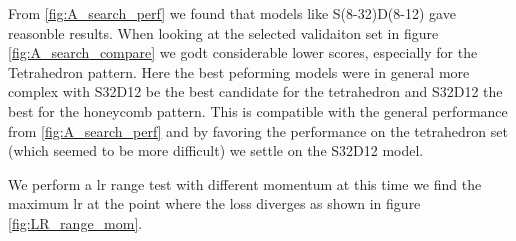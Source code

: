 From \cref{fig:A_search_perf} we found that models like S(8-32)D(8-12) gave reasonble results. When looking at the selected validaiton set in figure \cref{fig:A_search_compare} we godt considerable lower scores, especially for the Tetrahedron pattern. Here the best peforming models were in general more complex with S32D12 be the best candidate for the tetrahedron and S32D12 the best for the honeycomb pattern. This is compatible with the general performance from \cref{fig:A_search_perf} and by favoring the performance on the tetrahedron set (which seemed to be more difficult) we settle on the S32D12 model.


We perform a lr range test with different momentum at this time we find the maximum lr at the point where the loss diverges as shown in figure \cref{fig:LR_range_mom}.


